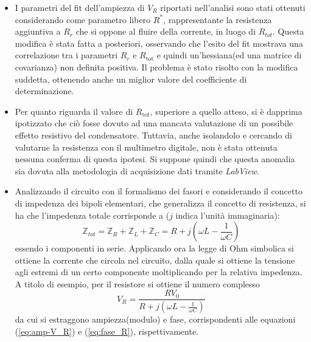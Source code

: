 
\begin{itemize}
    \item I parametri del fit dell'ampiezza di $V_R$ riportati nell'analisi sono stati ottenuti considerando come parametro libero
    $R^*$, rappresentante la resistenza aggiuntiva a $R_r$ che si oppone al fluire della
    corrente, in luogo di $R_{tot}$.
    Questa modifica è stata fatta a posteriori, osservando che l'esito del fit mostrava una
    correlazione tra i parametri $R_r$ e $R_{\text{tot}}$ e quindi un'hessiana(ed una matrice di covarianza) non definita
    positiva.
    Il problema è stato risolto con la modifica suddetta, ottenendo anche un miglior valore del coefficiente
    di determinazione.
    \item Per quanto riguarda il valore di $R_{\text{tot}}$, superiore a quello atteso, si è dapprima ipotizzato
    che ciò fosse dovuto ad una mancata valutazione di un possibile effetto resistivo del condensatore.
    Tuttavia, anche isolandolo e cercando di valutarne la resistenza con il multimetro digitale, non è stata ottenuta
    nessuna conferma di questa ipotesi.
    Si suppone quindi che questa anomalia sia dovuta alla metodologia di acquisizione dati tramite \emph{LabView}.
    \item Analizzando il circuito con il formalismo dei fasori e considerando il concetto di impedenza dei bipoli elementari, che
    generalizza il concetto di resistenza, si ha che l'impedenza totale corrisponde a ($j$ indica l'unità immaginaria):
    \[
        \mathbb{Z}_{tot} = \mathbb{Z}_R + \mathbb{Z}_L + \mathbb{Z}_C = R + j \left( \omega L - \frac{1}{\omega C} \right)
    \]
    essendo i componenti in serie. Applicando ora la legge di Ohm simbolica si ottiene la corrente che circola nel circuito,
    dalla quale si ottiene la tensione agli estremi di un certo componente moltiplicando per la relativa impedenza.
    A titolo di esempio, per il resistore si ottiene il numero complesso
    \[
        V_R = \frac{R V_0}{ R + j \left( \omega L - \frac{1}{\omega C} \right)}
    \]
    da cui si estraggono ampiezza(modulo) e fase, corrispondenti alle equazioni  (\ref{eq:amp-V_R}) e (\ref{eq:fase_R}),
    rispettivamente.
\end{itemize}









